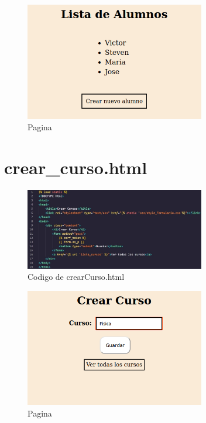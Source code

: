 \documentclass[10pt, a4paper]{article}
\begin{document}
\begin{figure}[H]
  \centering
  \includegraphics[width=0.7\textwidth]{img/ListaAlumnos.png}
  \caption{Pagina}
\end{figure}

\section{crear\_curso.html }
\begin{figure}[H]
  \centering
  \includegraphics[width=0.7\textwidth]{img/imagen8.jpeg}
  \caption{Codigo de crearCurso.html}
\end{figure} 

\begin{figure}[H]
  \centering
  \includegraphics[width=0.7\textwidth]{img/CrearCurso.png}
  \caption{Pagina}
\end{figure}
\end{document}
